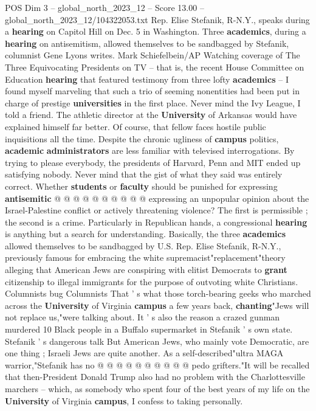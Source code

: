 \begin{textsample}{POS Dim 3 – global\_north\_2023\_12 – Score 13.00 – global\_north\_2023\_12/104322053.txt}  \label{ex:f3_pos_265}
Rep.
Elise Stefanik, R-N.Y., speaks during a \textbf{hearing} on Capitol Hill on Dec. 5 in Washington.
Three \textbf{academics}, during a \textbf{hearing} on antisemitism, allowed themselves to be sandbagged by Stefanik, columnist Gene Lyons writes.
Mark Schiefelbein/AP Watching coverage of The Three Equivocating Presidents on TV -- that is, the recent House Committee on Education \textbf{hearing} that featured testimony from three lofty \textbf{academics} -- I found myself marveling that such a trio of seeming nonentities had been put in charge of prestige \textbf{universities} in the first place.
Never mind the Ivy League, I told a friend.
The athletic director at the \textbf{University} of Arkansas would have explained himself far better.
Of course, that fellow faces hostile public inquisitions all the time.
Despite the chronic ugliness of \textbf{campus} politics, \textbf{academic} \textbf{administrators} are less familiar with televised interrogations.
By trying to please everybody, the presidents of Harvard, Penn and MIT ended up satisfying nobody.
Never mind that the gist of what they said was entirely correct.
Whether \textbf{students} or \textbf{faculty} should be punished for expressing \textbf{antisemitic} @ @ @ @ @ @ @ @ @ @ expressing an unpopular opinion about the Israel-Palestine conflict or actively threatening violence?
The first is permissible ; the second is a crime.
Particularly in Republican hands, a congressional \textbf{hearing} is anything but a search for understanding.
Basically, the three \textbf{academics} allowed themselves to be sandbagged by U.S.
Rep.
Elise Stefanik, R-N.Y., previously famous for embracing the white supremacist"replacement"theory alleging that American Jews are conspiring with elitist Democrats to \textbf{grant} citizenship to illegal immigrants for the purpose of outvoting white Christians.
Columnists bug Columnists That ' s what those torch-bearing geeks who marched across the \textbf{University} of Virginia \textbf{campus} a few years back, \textbf{chanting}"Jews will not replace us,"were talking about.
It ' s also the reason a crazed gunman murdered 10 Black people in a Buffalo supermarket in Stefanik ' s own state.
Stefanik ' s dangerous talk But American Jews, who mainly vote Democratic, are one thing ; Israeli Jews are quite another.
As a self-described"ultra MAGA warrior,"Stefanik has no @ @ @ @ @ @ @ @ @ @ pedo grifters."It will be recalled that then-President Donald Trump also had no problem with the Charlottesville marchers -- which, as somebody who spent four of the best years of my life on the \textbf{University} of Virginia \textbf{campus}, I confess to taking personally.

\end{textsample}
